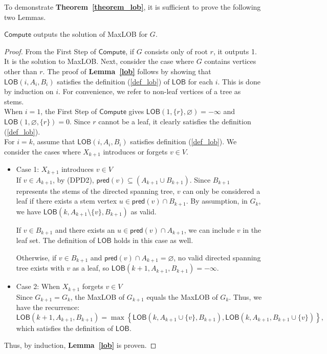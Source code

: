 \documentclass[runningheads]{llncs}
\theoremstyle{plain}
\theoremstyle{definition}
\begin{document}
To demonstrate \textbf{Theorem~\ref{theorem_lob}}, it is sufficient to prove the following two Lemmas.

\begin{lemma}\label{lob}
    $\mathsf{Compute}$ outputs the solution of MaxLOB for $G$.
\end{lemma}

\begin{proof}
    From the First Step of $\mathsf{Compute}$, if $G$ consists only of root $r$, it outputs 1. It is the solution to MaxLOB. Next, consider the case where $G$ contains vertices other than $r$. The proof of \textbf{Lemma~\ref{lob}} follows by showing that $\mathsf{LOB}(i, A_i, B_i)$ satisfies the definition (\ref{def_lob}) of $\mathsf{LOB}$ for each $i$. This is done by induction on $i$. For convenience, we refer to non-leaf vertices of a tree as stems.\\
    When $i=1$, the First Step of $\mathsf{Compute}$ gives $\mathsf{LOB}(1, \{r\}, \varnothing) = -\infty$ and $\mathsf{LOB}(1, \varnothing, \{r\}) = 0$. Since $r$ cannot be a leaf, it clearly satisfies the definition (\ref{def_lob}).\\
    For $i=k$, assume that $\mathsf{LOB}(i, A_i, B_i)$ satisfies definition (\ref{def_lob}). We consider the cases where $X_{k+1}$ introduces or forgets $v \in V$.
    \begin{itemize}
        \item Case 1: $X_{k+1}$ introduces $v \in V$
        \\
        If $v \in A_{k+1}$, by (DPD2), $\mathsf{pred}(v) \subseteq (A_{k+1} \cup B_{k+1})$. Since $B_{k+1}$ represents the stems of the directed spanning tree, $v$ can only be considered a leaf if there exists a stem vertex $u \in \mathsf{pred}(v) \cap B_{k+1}$. By assumption, in $G_k$, we have $\mathsf{LOB}(k, A_{k+1} \setminus \{v\}, B_{k+1})$ as valid.
        
        If $v \in B_{k+1}$ and there exists an $u \in \mathsf{pred}(v) \cap A_{k+1}$, we can include $v$ in the leaf set. The definition of $\mathsf{LOB}$ holds in this case as well.

        Otherwise, if $v \in B_{k+1}$ and $\mathsf{pred}(v) \cap A_{k+1} = \varnothing$, no valid directed spanning tree exists with $v$ as a leaf, so $\mathsf{LOB}(k+1, A_{k+1}, B_{k+1}) = -\infty$.

        \item Case 2: When $X_{k+1}$ forgets $v \in V$
        \\
        Since $G_{k+1} = G_k$, the MaxLOB of $G_{k+1}$ equals the MaxLOB of $G_k$. Thus, we have the recurrence:
        \[
        \mathsf{LOB}(k+1, A_{k+1}, B_{k+1}) = \max \left\{ \mathsf{LOB}(k, A_{k+1} \cup \{v\}, B_{k+1}), \mathsf{LOB}(k, A_{k+1}, B_{k+1} \cup \{v\}) \right\},
        \]
        which satisfies the definition of $\mathsf{LOB}$.
    \end{itemize}
    Thus, by induction, \textbf{Lemma~\ref{lob}} is proven.
\end{proof}
\end{document}
